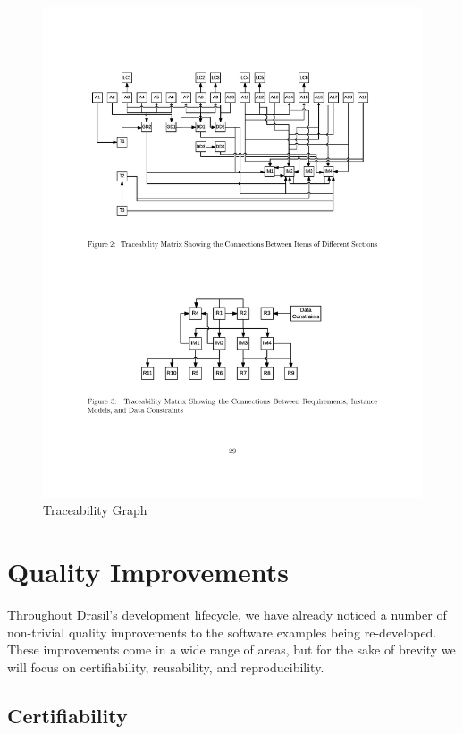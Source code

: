 \documentclass[sigconf]{acmart}
\begin{document}
{\begin{figure}
\begin{center}
\includegraphics[scale=0.5]{./figures/TraceGraph.pdf}
\end{center}
\caption{Traceability Graph}
\label{Fig_TraceGraph}
\end{figure}

\section{Quality Improvements} \label{SecQuality}

Throughout Drasil's development lifecycle, we have already noticed a number of 
non-trivial quality improvements to the software examples being re-developed. 
These improvements come in a wide range of areas, but for the sake of brevity 
we will focus on certifiability, reusability, and reproducibility.

\subsection{Certifiability}

}
\end{document}
